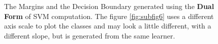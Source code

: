 \documentclass[a4paper, 11pt]{article}
\begin{document}
\begin{figure}
\centering
{}
\caption[]{The Margins and the Decision Boundary generated using the \textbf{Dual Form} of SVM computation. The figure \autoref{fig:subfig6} uses a different axis scale to plot the classes and may look a little different, with a different slope, but is generated from the same learner.}
\label{fig:dualplots}
\end{figure}

\vspace{-10pt}
\end{document}
